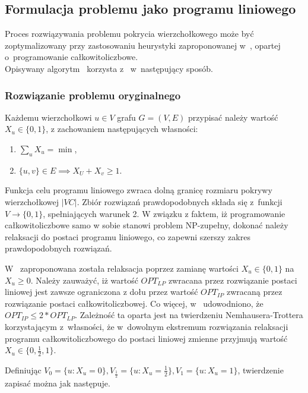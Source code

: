 \subsection{Formulacja problemu jako programu liniowego }\label{section_kernelization_lp_formulation}

Proces rozwiązywania problemu pokrycia wierzchołkowego może być zoptymalizowany
przy zastosowaniu heurystyki zaproponowanej w~\cite{hochbaum82}, opartej 
o~programowanie całkowitoliczbowe. \\
Opisywany algorytm~\cite[rozdz.~4.2.2]{abukhzam03} korzysta z~\cite{hochbaum82} 
w~następujący sposób.

\subsubsection{\textbf{Rozwiązanie problemu oryginalnego}}\label{ss_lp_original}

Każdemu wierzchołkowi $u \in V$ grafu $G=(V,E)$ przypisać należy wartość $X_u
\in \{0, 1\}$, z zachowaniem następujących własności:
\begin{enumerate}
  \item $\sum_{u}X_u = \min$,
  \item $\{u,v\} \in E \implies X_U + X_v \geq 1$.
\end{enumerate}

Funkcja celu programu liniowego zwraca dolną granicę rozmiaru pokrywy 
wierzchołkowej $|VC|$.
Zbiór rozwiązań prawdopodobnych składa się z~funkcji $V \to \{0, 1\}$,
spełniających warunek 2.
W związku z faktem, iż programowanie całkowitoliczbowe samo w sobie stanowi
problem NP-zupełny, dokonać należy relaksacji do postaci programu liniowego, co
zapewni szerszy zakres prawdopodobnych rozwiązań.

W~\cite{khuller02} zaproponowana została relaksacja poprzez zamianę wartości 
$X_u \in \{0,1\}$ na $X_u \geq 0$.
Należy zauważyć, iż wartość $OPT_{LP}$ zwracana przez rozwiązanie postaci 
liniowej jest zawsze ograniczona z dołu przez wartość $OPT_{IP}$ zwracaną przez 
rozwiązanie postaci całkowitoliczbowej.
Co więcej, w~\cite{khuller02} udowodniono, że $OPT_{IP} \leq 2*OPT_{LP}$.
Zależność ta oparta jest na twierdzeniu Nemhausera-Trottera korzystającym
z~własności, że w~dowolnym ekstremum rozwiązania relaksacji programu
całkowitoliczbowego do postaci liniowej zmienne przyjmują wartość 
$X_u \in \{0, \frac{1}{2}, 1\}$.

Definiując $V_0 = \{u : X_u=0\}, V_{\frac{1}{2}}=\{u: X_u=\frac{1}{2}\},
V_1=\{u: X_u=1\}$, twierdzenie zapisać można jak następuje.

